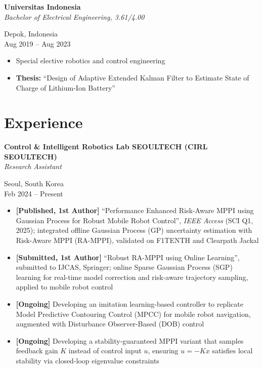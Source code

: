 \documentclass[a4paper,10pt]{article}
\begin{document}
\noindent
\begin{minipage}[t]{0.68\textwidth}
    \textbf{Universitas Indonesia} \\
    \textit{Bachelor of Electrical Engineering, 3.61/4.00}
\end{minipage}%
\begin{minipage}[t]{0.32\textwidth}
    \raggedleft
    Depok, Indonesia \\
    Aug 2019 -- Aug 2023
\end{minipage}
\begin{itemize}[leftmargin=*, noitemsep]
    \item Special elective robotics and control engineering
    \item \textbf{Thesis:} ``Design of Adaptive Extended Kalman Filter to Estimate State of Charge of Lithium-Ion Battery''
\end{itemize}

\section*{Experience}

\noindent
\begin{minipage}[t]{0.68\textwidth}
    \textbf{Control \& Intelligent Robotics Lab SEOULTECH (CIRL SEOULTECH)} \\
    \textit{Research Assistant}
\end{minipage}%
\begin{minipage}[t]{0.32\textwidth}
    \raggedleft
    Seoul, South Korea \\
    Feb 2024 -- Present
\end{minipage}
\begin{itemize}[leftmargin=*, noitemsep]
    \item \textbf{[Published, 1st Author]} ``Performance Enhanced Risk-Aware MPPI using Gaussian Process for Robust Mobile Robot Control'', \textit{IEEE Access} (SCI Q1, 2025); integrated offline Gaussian Process (GP) uncertainty estimation with Risk-Aware MPPI (RA-MPPI), validated on F1TENTH and Clearpath Jackal
    \item \textbf{[Submitted, 1st Author]} ``Robust RA-MPPI using Online Learning'', submitted to IJCAS, Springer; online Sparse Gaussian Process (SGP) learning for real-time model correction and risk-aware trajectory sampling, applied to mobile robot control
    \item \textbf{[Ongoing]} Developing an imitation learning-based controller to replicate Model Predictive Contouring Control (MPCC) for mobile robot navigation, augmented with Disturbance Observer-Based (DOB) control
    \item \textbf{[Ongoing]} Developing a stability-guaranteed MPPI variant that samples feedback gain $K$ instead of control input $u$, ensuring $u = -Kx$ satisfies local stability via closed-loop eigenvalue constraints
\end{itemize}
\end{document}
